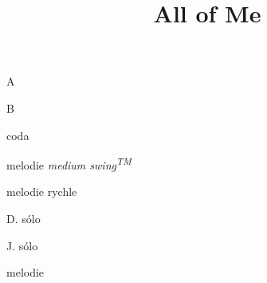 \documentclass[timestamp]{jazzgrid}
\title{\textbf{All of Me}}
\begin{document}
\maketitle
\begin{musicsection}{A}
\barline
	{\barfour{}
		{}
		{}
		{}
		{}
	}
	{\barfour{}
		{}
		{}
		{}
		{}
	}
	{\barfour{}
		{}
		{}
		{}
		{}
	}
	{\barfour{}
		{}
		{}
		{}
		{}
	}
\barline
	{\barfour{}
		{}
		{}
		{}
		{}
	}
	{\barfour{}
		{}
		{}
		{}
		{}
	}
	{\barfour{}
		{}
		{}
		{}
		{}
	}
	{\barfour{}
		{}
		{}
		{}
		{}
	}
\barline
	{\barfour{}
		{}
		{}
		{}
		{}
	}
	{\barfour{}
		{}
		{}
		{}
		{}
	}
	{\barfour{}
		{}
		{}
		{}
		{}
	}
	{\barfour{}
		{}
		{}
		{}
		{}
	}
\barline
	{\barfour{}
		{}
		{}
		{}
		{}
	}
	{\barfour{}
		{}
		{}
		{}
		{}
	}
	{\barfour{}
		{}
		{}
		{}
		{}
	}
	{\barfour{}
		{}
		{}
		{}
		{}
	}
\end{musicsection}

\begin{musicsection}{B}
\barline
	{\barfour{}
		{}
		{}
		{}
		{}
	}
	{\barfour{}
		{}
		{}
		{}
		{}
	}
	{\barfour{}
		{}
		{}
		{}
		{}
	}
	{\barfour{}
		{}
		{}
		{}
		{}
	}
\barline
	{\barfour{}
		{}
		{}
		{}
		{}
	}
	{\barfour{}
		{}
		{}
		{}
		{}
	}
	{\barfour{}
		{}
		{}
		{}
		{}
	}
	{\barfour{}
		{}
		{}
		{}
		{}
	}
\barline
	{\barfour{}
		{}
		{}
		{}
		{}
	}
	{\barfour{}
		{}
		{}
		{}
		{}
	}
	{\barfour{}
		{}
		{}
		{}
		{}
	}
	{\barfour{}
		{}
		{}
		{}
		{}
	}
\barline
	{
		{}
		{}
		{}
		{}
	}
	{\barfour{}
		{}
		{}
		{}
		{}
	}
	{\barfour{}
		{}
		{}
		{}
		{}
	}
	{\barfour{}
		{}
		{}
		{}
		{}
	}
\end{musicsection}

\begin{musicsection}{coda}
\barline
	{\barfour{}
		{}
		{}
		{}
		{}
	}
	{\barfour{}
		{}
		{}
		{}
		{}
	}
	{\barfour{}
		{}
		{}
		{}
		{}
	}
	{\barfour{}
		{}
		{}
		{}
		{}
	}
	{\barfour{}
		{}
		{}
		{}
		{}
	}
	{\barfour{}
		{}
		{}
		{}
		{}
	}
	{\barfour{}
		{}
		{}
		{}
		{}
	}
\end{musicsection}


\begin{multicols*}{2}
\begin{description}[noitemsep,align=right,labelwidth=48pt]
	\scriptsize
	\item [AB] melodie \emph{medium swing\textsuperscript{TM}}
	\item [AB] melodie rychle
	\item [AB] D. sólo
	\item [ABAB] J. sólo
	\item [AB] melodie
\end{description}

\end{multicols*}
\end{document}

